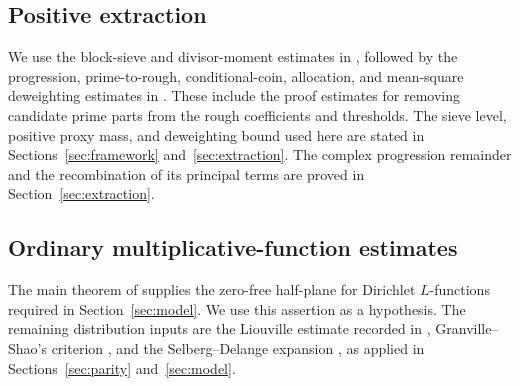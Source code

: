 \subsection*{Positive extraction}
We use the block-sieve and divisor-moment estimates in
\cite[Section 2]{D}, followed by the progression, prime-to-rough,
conditional-coin, allocation, and mean-square deweighting estimates in
\cite[Section 7]{D}. These include the proof estimates for removing
candidate prime parts from the rough coefficients and thresholds.
The sieve level, positive proxy mass, and deweighting bound used here
are stated in Sections~\ref{sec:framework} and~\ref{sec:extraction}.
The complex progression remainder and the recombination of its
principal terms are proved in Section~\ref{sec:extraction}.

\subsection*{Ordinary multiplicative-function estimates}
The main theorem of \cite{Z} supplies the zero-free half-plane for
Dirichlet $L$-functions required in Section~\ref{sec:model}. We use
this assertion as a hypothesis. The remaining distribution inputs are
the Liouville estimate recorded in \cite[equation (1.5)]{Pintz},
Granville--Shao's criterion \cite[Theorem 1.1(b)]{GS}, and the
Selberg--Delange expansion \cite[Theorem 1.2 and equation (1.10)]{BT},
as applied in Sections~\ref{sec:parity} and~\ref{sec:model}.
